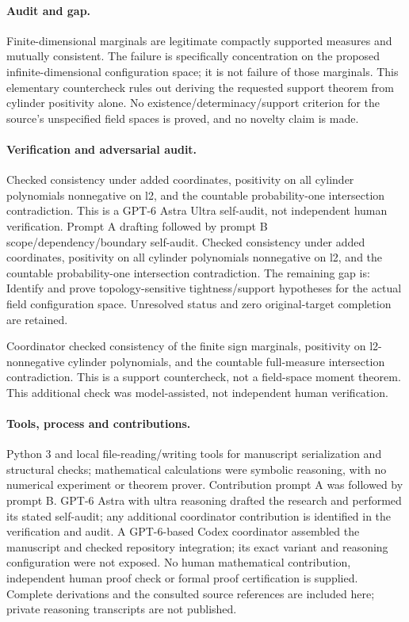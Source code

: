 \documentclass[11pt]{article}
\begin{document}
\paragraph{Audit and gap.} Finite-dimensional marginals are legitimate compactly supported measures and mutually consistent. The failure is specifically concentration on the proposed infinite-dimensional configuration space; it is not failure of those marginals. This elementary countercheck rules out deriving the requested support theorem from cylinder positivity alone. No existence/determinacy/support criterion for the source's unspecified field spaces is proved, and no novelty claim is made.

\paragraph{Verification and adversarial audit.}
Checked consistency under added coordinates, positivity on all cylinder polynomials nonnegative on l2, and the countable probability-one intersection contradiction. This is a GPT-6 Astra Ultra self-audit, not independent human verification. Prompt A drafting followed by prompt B scope/dependency/boundary self-audit. Checked consistency under added coordinates, positivity on all cylinder polynomials nonnegative on l2, and the countable probability-one intersection contradiction. The remaining gap is: Identify and prove topology-sensitive tightness/support hypotheses for the actual field configuration space. Unresolved status and zero original-target completion are retained.

Coordinator checked consistency of the finite sign marginals, positivity on l2-nonnegative cylinder polynomials, and the countable full-measure intersection contradiction. This is a support countercheck, not a field-space moment theorem. This additional check was model-assisted, not independent human verification.

\paragraph{Tools, process and contributions.}
Python 3 and local file-reading/writing tools for manuscript serialization and structural checks; mathematical calculations were symbolic reasoning, with no numerical experiment or theorem prover. Contribution prompt A was followed by prompt B. GPT-6 Astra with ultra reasoning drafted the research and performed its stated self-audit; any additional coordinator contribution is identified in the verification and audit. A GPT-6-based Codex coordinator assembled the manuscript and checked repository integration; its exact variant and reasoning configuration were not exposed. No human mathematical contribution, independent human proof check or formal proof certification is supplied. Complete derivations and the consulted source references are included here; private reasoning transcripts are not published.
\end{document}
